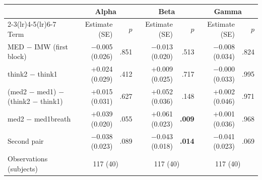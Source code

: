 \begin{tabular}{@{}lrrrrrr@{}}
\toprule
 & \multicolumn{2}{c}{Alpha} & \multicolumn{2}{c}{Beta} & \multicolumn{2}{c}{Gamma} \\
\cmidrule(lr){2-3}\cmidrule(lr){4-5}\cmidrule(lr){6-7}
Term & Estimate (SE) & $p$ & Estimate (SE) & $p$ & Estimate (SE) & $p$ \\
\midrule
MED $-$ IMW (first block) & $-$0.005 (0.026) & .851 & $-$0.013 (0.020) & .513 & $-$0.008 (0.034) & .824 \\
think2 $-$ think1 & +0.024 (0.029) & .412 & +0.009 (0.025) & .717 & $-$0.000 (0.033) & .995 \\
(med2 $-$ med1) $-$ (think2 $-$ think1) & +0.015 (0.031) & .627 & +0.052 (0.036) & .148 & +0.002 (0.046) & .971 \\
med2 $-$ med1breath & +0.039 (0.020) & .055 & +0.061 (0.023) & \textbf{.009} & +0.001 (0.036) & .968 \\
Second pair & $-$0.038 (0.023) & .089 & $-$0.043 (0.018) & \textbf{.014} & $-$0.041 (0.023) & .069 \\
Observations (subjects) & \multicolumn{2}{c}{117 (40)} & \multicolumn{2}{c}{117 (40)} & \multicolumn{2}{c}{117 (40)} \\
\bottomrule
\end{tabular}
